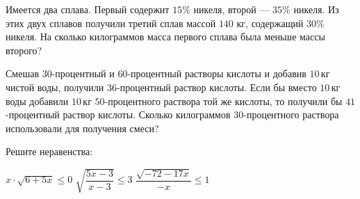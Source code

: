\begin{homework}[number=1]
	\begin{listofex}
		\item Имеется два сплава. Первый содержит \(15\% \) никеля, второй --- \(35\%\) никеля. Из этих двух сплавов получили третий сплав массой \(140\) кг, содержащий \(30 \%\) никеля. На сколько килограммов масса первого сплава была меньше массы второго?
		\item Смешав \(30\)-процентный и \(60\)-процентный растворы кислоты и добавив \(10\) кг чистой воды, получили \(36\)-процентный раствор кислоты. Если бы вместо \(10\) кг воды добавили \(10\) кг \(50\)-процентного раствора той же кислоты, то получили бы \(41\)-процентный раствор кислоты. Сколько килограммов \(30\)-процентного раствора использовали для получения смеси?
		\item Решите неравенства:
		\begin{tasks}
			\task \( x \cdot \sqrt{6+5x} \leq 0 \)
			\task \( \sqrt{\dfrac{5x-3}{x-3}} \leq 3 \)
			\task \( \dfrac{\sqrt{-72-17x}}{-x} \leq 1 \)
		\end{tasks}
	\end{listofex}
\end{homework}
%
%
%
%
%
%
